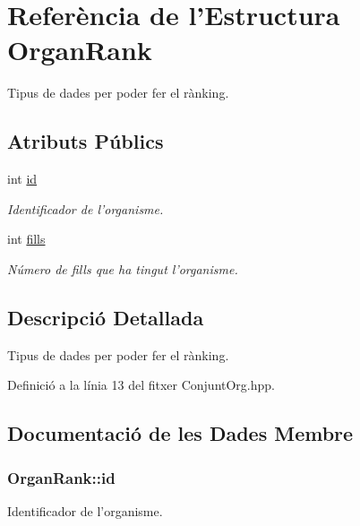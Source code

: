 \hypertarget{struct_organ_rank}{\section{Referència de l'Estructura Organ\-Rank}
\label{struct_organ_rank}
}


Tipus de dades per poder fer el rànking.  


\subsection*{Atributs Públics}
\begin{DoxyCompactItemize}
\item 
int \hyperlink{struct_organ_rank_a4c2294bdeab2be3ce7e6142687a0542c}{id}
\begin{DoxyCompactList}\small\item\em Identificador de l'organisme. \end{DoxyCompactList}\item 
int \hyperlink{struct_organ_rank_ac822919ccf32979e8c4d8384a1949b08}{fills}
\begin{DoxyCompactList}\small\item\em Número de fills que ha tingut l'organisme. \end{DoxyCompactList}\end{DoxyCompactItemize}


\subsection{Descripció Detallada}
Tipus de dades per poder fer el rànking. 

Definició a la línia 13 del fitxer Conjunt\-Org.\-hpp.



\subsection{Documentació de les Dades Membre}
\hypertarget{struct_organ_rank_a4c2294bdeab2be3ce7e6142687a0542c}{
\subsubsection[{id}]{\setlength{\rightskip}{0pt plus 5cm}Organ\-Rank\-::id}}\label{struct_organ_rank_a4c2294bdeab2be3ce7e6142687a0542c}


Identificador de l'organisme. 



